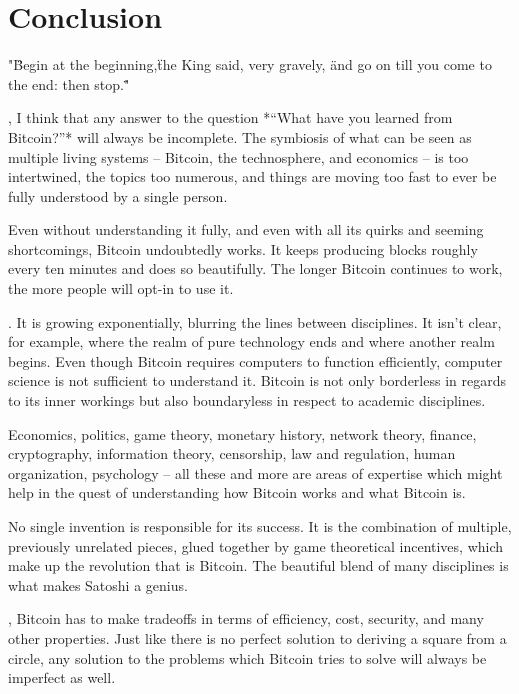 \chapter{Conclusion}
\label{ch:conclusion}

"\"Begin at the beginning,\" the King said, very gravely, \"and go on till you come to the end: then stop.\""

, I think that any answer to the
question *“What have you learned from Bitcoin?”* will always be incomplete. The
symbiosis of what can be seen as multiple living systems -- Bitcoin, the
technosphere, and economics -- is too intertwined, the topics too numerous, and
things are moving too fast to ever be fully understood by a single person.

Even without understanding it fully, and even with all its quirks and seeming
shortcomings, Bitcoin undoubtedly works. It keeps producing blocks roughly every
ten minutes and does so beautifully. The longer Bitcoin continues to work, the
more people will opt-in to use it.


. It is growing exponentially,
blurring the lines between disciplines. It isn’t clear, for example, where the
realm of pure technology ends and where another realm begins. Even though
Bitcoin requires computers to function efficiently, computer science is not
sufficient to understand it. Bitcoin is not only borderless in regards to its
inner workings but also boundaryless in respect to academic disciplines.

Economics, politics, game theory, monetary history, network theory, finance,
cryptography, information theory, censorship, law and regulation, human
organization, psychology -- all these and more are areas of expertise which might
help in the quest of understanding how Bitcoin works and what Bitcoin is.

No single invention is responsible for its success. It is the combination of
multiple, previously unrelated pieces, glued together by game theoretical
incentives, which make up the revolution that is Bitcoin. The beautiful blend of
many disciplines is what makes Satoshi a genius.

, Bitcoin has to make tradeoffs in terms
of efficiency, cost, security, and many other properties. Just like there is no
perfect solution to deriving a square from a circle, any solution to the
problems which Bitcoin tries to solve will always be imperfect as well.

